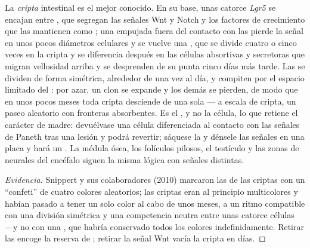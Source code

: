 \begin{proposition}\label{prop:b3:stem-cells:crypt}
La \emph{cripta} intestinal es el  mejor conocido. En su base, unas
catorce  \emph{Lgr5} se encajan entre ,
que segregan las señales Wnt y Notch y los factores de crecimiento que
las mantienen como ; una  empujada fuera del
contacto con las  pierde la señal en unos pocos
diámetros celulares y se vuelve una ,
que se divide cuatro o cinco veces en la cripta y se diferencia después
en las células absortivas y secretoras que migran vellosidad arriba y
se desprenden de su punta cinco días más tarde. Las  se
dividen de forma simétrica, alrededor de una vez al día, y compiten por
el espacio limitado del : por azar, un clon se expande y los demás
se pierden, de modo que en unos pocos meses toda cripta desciende de
una sola  ---\emph{} a escala de cripta, un
paseo aleatorio con fronteras absorbentes. Es el , y no la célula,
lo que retiene el carácter de madre: devuélvase una célula diferenciada
al contacto con las señales de Paneth tras una lesión y podrá revertir;
sáquese la  y dénsele las señales en una placa y hará un
. La médula ósea, los folículos pilosos, el testículo y las
zonas de  neurales del encéfalo siguen la misma lógica con
señales distintas.
\end{proposition}
\begin{proof}[Evidencia]
Snippert y sus colaboradores (2010) marcaron las  de las
criptas con un ``confeti'' de cuatro colores aleatorios; las criptas
eran al principio multicolores y habían pasado a tener un solo color al
cabo de unos meses, a un ritmo compatible con una división simétrica y
una competencia neutra entre unas catorce células ---y no con una
, que habría conservado todos los colores
indefinidamente. Retirar las  encoge la reserva de
; retirar la señal Wnt vacía la cripta en días.
\end{proof}

